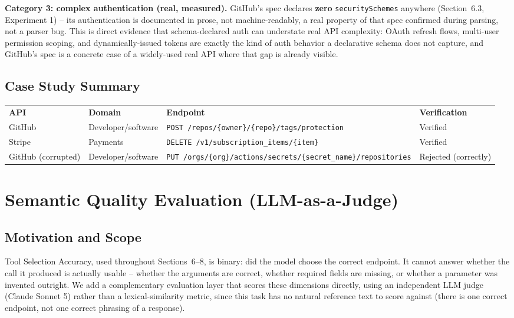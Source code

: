\documentclass[11pt]{article}
\begin{document}
\textbf{Category 3: complex authentication (real, measured).} GitHub's spec declares
\textbf{zero} \texttt{securitySchemes} anywhere (Section~6.3, Experiment 1) -- its authentication
is documented in prose, not machine-readably, a real property of that spec confirmed during
parsing, not a parser bug. This is direct evidence that schema-declared auth can understate real
API complexity: OAuth refresh flows, multi-user permission scoping, and dynamically-issued tokens
are exactly the kind of auth behavior a declarative schema does not capture, and GitHub's spec is
a concrete case of a widely-used real API where that gap is already visible.

\subsection{Case Study Summary}
\begin{center}
\footnotesize
\begin{tabular}{p{1.6cm}p{2cm}p{6.5cm}p{2.2cm}}
\textbf{API} & \textbf{Domain} & \textbf{Endpoint} & \textbf{Verification} \\
GitHub & Developer/\allowbreak software & \texttt{POST /repos/\allowbreak\{owner\}/\allowbreak\{repo\}/\allowbreak tags/\allowbreak protection} & Verified \\
Stripe & Payments & \texttt{DELETE /v1/\allowbreak subscription\_items/\allowbreak\{item\}} & Verified \\
GitHub (corrupted) & Developer/\allowbreak software & \texttt{PUT /orgs/\allowbreak\{org\}/\allowbreak actions/\allowbreak secrets/\allowbreak\{secret\_name\}/\allowbreak repositories} & Rejected (correctly) \\
\end{tabular}
\end{center}

\section{Semantic Quality Evaluation (LLM-as-a-Judge)}

\subsection{Motivation and Scope}
Tool Selection Accuracy, used throughout Sections~6--8, is binary: did the model choose the
correct endpoint. It cannot answer whether the call it produced is actually usable -- whether the
arguments are correct, whether required fields are missing, or whether a parameter was invented
outright. We add a complementary evaluation layer that scores these dimensions directly, using an
independent LLM judge (Claude Sonnet 5) rather than a lexical-similarity metric, since this task
has no natural reference text to score against (there is one correct endpoint, not one correct
phrasing of a response).
\end{document}
